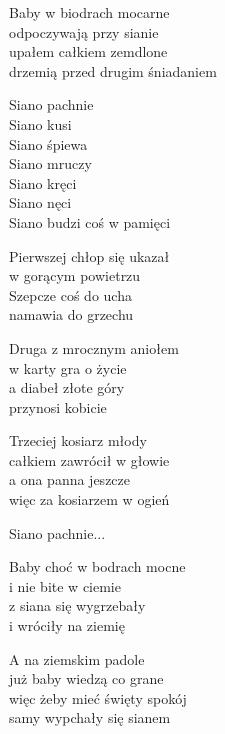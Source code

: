 \begin{text}
    Baby w biodrach mocarne\\
    odpoczywają przy sianie\\
    upałem całkiem zemdlone\\
    drzemią przed drugim śniadaniem

    \vin Siano pachnie\\
    \vin Siano kusi\\
    \vin Siano śpiewa\\
    \vin Siano mruczy\\
    \vin Siano kręci\\
    \vin Siano nęci\\
    \vin Siano budzi coś w pamięci

    Pierwszej chłop się ukazał\\
    w gorącym powietrzu\\
    Szepcze coś do ucha\\
    namawia do grzechu

    Druga z mrocznym aniołem\\
    w karty gra o życie\\
    a diabeł złote góry\\
    przynosi kobicie

    Trzeciej kosiarz młody\\
    całkiem zawrócił w głowie\\
    a ona panna jeszcze\\
    więc za kosiarzem w ogień

    \vin Siano pachnie...

    Baby choć w bodrach mocne\\
    i nie bite w ciemie\\
    z siana się wygrzebały\\
    i wróciły na ziemię

    A na ziemskim padole\\
    już baby wiedzą co grane\\
    więc żeby mieć święty spokój\\
    samy wypchały się sianem
\end{text}
\begin{chord}

\end{chord}